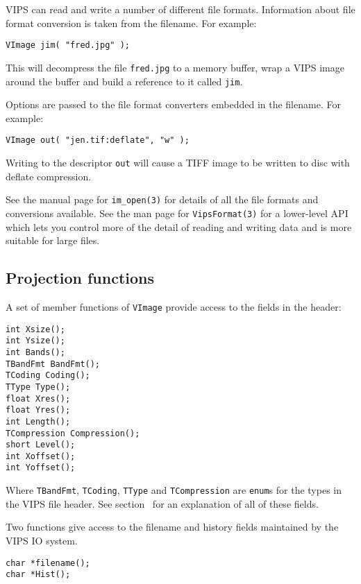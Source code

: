 VIPS can read and write a number of different file formats. Information about
file format conversion is taken from the filename. For example:

\begin{verbatim}
VImage jim( "fred.jpg" );
\end{verbatim}

\noindent
This will decompress the file \verb+fred.jpg+ to a memory buffer, wrap a VIPS
image around the buffer and build a reference to it called \verb+jim+.

Options are passed to the file format converters embedded in the filename. For
example:

\begin{verbatim}
VImage out( "jen.tif:deflate", "w" );
\end{verbatim}

\noindent
Writing to the descriptor \verb+out+ will cause a TIFF image to be written to
disc with deflate compression.

See the manual page for \verb+im_open(3)+ for details of all the file formats
and conversions available. See the man page for \verb+VipsFormat(3)+ for a
lower-level API which lets you control more of the detail of reading and
writing data and is more suitable for large files.

\subsection{Projection functions}

A set of member functions of \verb+VImage+ provide access to the fields in
the header:

\begin{verbatim}
int Xsize();
int Ysize();
int Bands();
TBandFmt BandFmt();
TCoding Coding();
TType Type();
float Xres();
float Yres();
int Length();
TCompression Compression();
short Level();
int Xoffset();
int Yoffset();
\end{verbatim}

\noindent
Where \verb+TBandFmt+, \verb+TCoding+, \verb+TType+ and \verb+TCompression+
are \verb+enum+s for the types in the VIPS file header. See
section~ for an explanation of all of these fields.

Two functions give access to the filename and history
fields maintained by the VIPS IO system.

\begin{verbatim}
char *filename();
char *Hist();
\end{verbatim}

